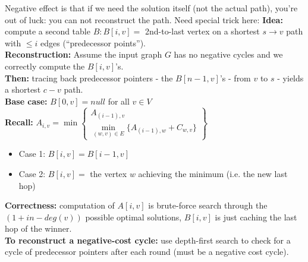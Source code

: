 \documentclass{scrartcl}
\begin{document}
Negative effect is that if we need the solution itself (not the actual path),
you're out of luck: you can not reconstruct the path. Need special trick here:
{\bf Idea: } compute a second table $B: B[i, v] = $ 2nd-to-last vertex on a
shortest $s \rightarrow v$ path with $\leq i$ edges (``predecessor points'').\\
{\bf Reconstruction: } Assume the input graph $G$ has no negative cycles and we
correctly compute the $B[i, v]$'s. \\
{\bf Then: } tracing back predecessor pointers - the $B[n-1, v]$'s - from $v$ to
$s$ - yields a shortest $c-v$ path.\\
{\bf Base case: } $B[0, v] = null$ for all $v \in V$\\
{\bf Recall: } $A_{i, v} = \min \left\{\begin{smallmatrix} A_{(i-1), v} \\
    \min \limits_{(w, v) \in E} \{A_{(i-1), w} + C_{w, v} \} \end{smallmatrix}
\right\}$
\begin{itemize}
\item Case 1: $B[i, v] = B[i-1, v]$
\item Case 2: $B[i, v] = $ the vertex $w$ achieving the minimum (i.e. the new
  last hop)
\end{itemize} {\bf Correctness: } computation of $A[i, v]$ is brute-force search
through the $(1 + in-deg(v))$ possible optimal solutions, $B[i, v]$ is just
caching the last
hop of the winner.\\
{\bf To reconstruct a negative-cost cycle: } use depth-first search to check for
a cycle of predecessor pointers after each round (must be a negative cost
cycle).

\end{document}
